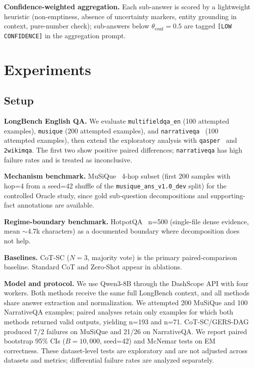 \documentclass[letterpaper]{article} %
\begin{document}
\noindent\textbf{Confidence-weighted aggregation.} Each sub-answer is scored by a lightweight heuristic (non-emptiness, absence of uncertainty markers, entity grounding in context, pure-number check); sub-answers below $\theta_{\text{conf}}{=}0.5$ are tagged \texttt{[LOW CONFIDENCE]} in the aggregation prompt.

\section{Experiments}

\subsection{Setup}

\noindent\textbf{LongBench English QA.} We evaluate \texttt{multifieldqa\_en} (100 attempted examples), \texttt{musique} (200 attempted examples), and \texttt{narrativeqa}~\citep{kocisky2018narrativeqa} (100 attempted examples), then extend the exploratory analysis with \texttt{qasper}~\citep{dasigi2021qasper} and \texttt{2wikimqa}. The first two show positive paired differences; \texttt{narrativeqa} has high failure rates and is treated as inconclusive.

\noindent\textbf{Mechanism benchmark.} MuSiQue~\citep{trivedi2022musique} 4-hop subset (first 200 samples with hop=4 from a seed=42 shuffle of the \texttt{musique\_ans\_v1.0\_dev} split) for the controlled Oracle study, since gold sub-question decompositions and supporting-fact annotations are available.

\noindent\textbf{Regime-boundary benchmark.} HotpotQA~\citep{yang2018hotpotqa} n=500 (single-file dense evidence, mean $\sim$4.7k characters) as a documented boundary where decomposition does not help.

\noindent\textbf{Baselines.} CoT-SC ($N{=}3$, majority vote) is the primary paired-comparison baseline. Standard CoT and Zero-Shot appear in ablations.

\noindent\textbf{Model and protocol.} We use Qwen3-8B through the DashScope API with four workers. Both methods receive the same full LongBench context, and all methods share answer extraction and normalization. We attempted 200 MuSiQue and 100 NarrativeQA examples; paired analyses retain only examples for which both methods returned valid outputs, yielding n=193 and n=71. CoT-SC/GERS-DAG produced 7/2 failures on MuSiQue and 21/26 on NarrativeQA. We report paired bootstrap 95\% CIs ($B=10{,}000$, seed=42) and McNemar tests on EM correctness. These dataset-level tests are exploratory and are not adjusted across datasets and metrics; differential failure rates are analyzed separately.
\end{document}
